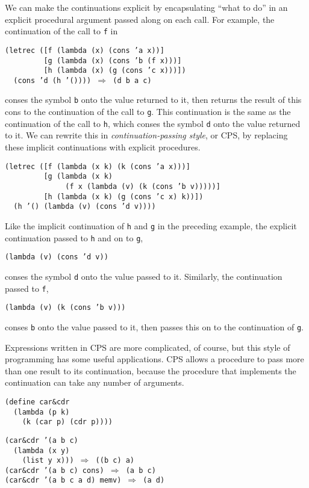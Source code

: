 We can make the continuations explicit by encapsulating ``what to do''
in an explicit procedural argument passed along on each call.
For example, the continuation of the call to \texttt{f} in


\begin{alltt}
(letrec ([f (lambda (x) (cons 'a x))]
         [g (lambda (x) (cons 'b (f x)))]
         [h (lambda (x) (g (cons 'c x)))])
  (cons 'd (h '()))) \(\Rightarrow\) (d b a c)
\end{alltt}


conses the symbol \texttt{b} onto the value returned to it, then returns
the result of this cons to the continuation of the call to \texttt{g}.
This continuation is the same as the continuation of the call to
\texttt{h}, which conses the symbol \texttt{d} onto the value returned to
it.
We can rewrite this in \textit{continuation-passing style}, or CPS,
by replacing these implicit continuations with explicit procedures.


\begin{alltt}
(letrec ([f (lambda (x k) (k (cons 'a x)))]
         [g (lambda (x k)
              (f x (lambda (v) (k (cons 'b v)))))]
         [h (lambda (x k) (g (cons 'c x) k))])
  (h '() (lambda (v) (cons 'd v))))
\end{alltt}


Like the implicit continuation of \texttt{h} and \texttt{g} in the preceding
example, the explicit continuation passed to \texttt{h} and on to \texttt{g},


\texttt{(lambda (v) (cons 'd v))}

conses the symbol \texttt{d} onto the value passed to it.
Similarly,
the continuation passed to \texttt{f},


\texttt{(lambda (v) (k (cons 'b v)))}

conses \texttt{b} onto the value passed to it, then passes this on to the
continuation of \texttt{g}.


Expressions written in CPS are more complicated, of course, but
this style of programming has some useful applications.
CPS allows
a procedure to pass more than one result to its continuation,
because the procedure that implements the continuation can
take any number of arguments.


\begin{alltt}
(define car\&{}cdr
  (lambda (p k)
    (k (car p) (cdr p))))

(car\&{}cdr '(a b c)
  (lambda (x y)
    (list y x))) \(\Rightarrow\) ((b c) a)
(car\&{}cdr '(a b c) cons) \(\Rightarrow\) (a b c)
(car\&{}cdr '(a b c a d) memv) \(\Rightarrow\) (a d)
\end{alltt}



